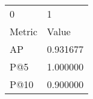 \begin{tabular}{ll}
0 & 1 \\
Metric & Value \\
AP & 0.931677 \\
P@5 & 1.000000 \\
P@10 & 0.900000 \\
\end{tabular}

